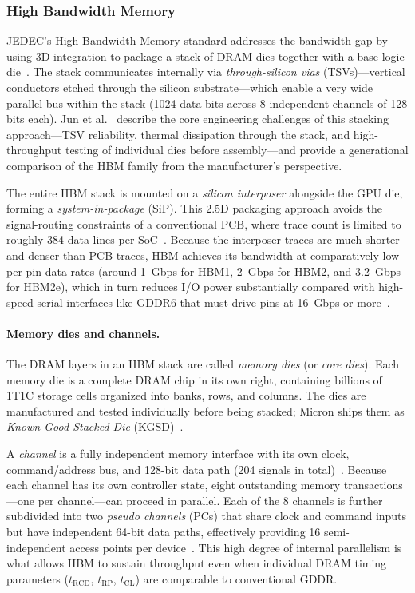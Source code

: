\subsubsection{High Bandwidth Memory}\label{sec:hbm-architecture}

JEDEC's High Bandwidth Memory standard addresses the bandwidth gap by using
3D integration to package a stack of DRAM dies together with a base logic
die~\cite{jedec2013hbm,jedec2016hbm2,jedec2020hbm2e}. The stack communicates
internally via \emph{through-silicon vias} (TSVs)---vertical conductors
etched through the silicon substrate---which enable a very wide parallel bus
within the stack (1024 data bits across 8 independent channels of 128 bits
each). Jun et al.~\cite{jun2017hbm} describe the core engineering
challenges of this stacking approach---TSV reliability, thermal dissipation
through the stack, and high-throughput testing of individual dies before
assembly---and provide a generational comparison of the HBM family from the
manufacturer's perspective.

The entire HBM stack is mounted on a \emph{silicon interposer} alongside the
GPU die, forming a \emph{system-in-package} (SiP). This 2.5D packaging
approach avoids the signal-routing constraints of a conventional PCB, where
trace count is limited to roughly 384 data lines per
SoC~\cite{micron2021hbm2e}. Because the interposer traces are much shorter
and denser than PCB traces, HBM achieves its bandwidth at comparatively low
per-pin data rates (around \SI{1}{\giga bps} for HBM1, \SI{2}{\giga bps}
for HBM2, and \SI{3.2}{\giga bps} for HBM2e), which in turn reduces I/O
power substantially compared with high-speed serial interfaces like GDDR6
that must drive pins at \SI{16}{\giga bps} or
more~\cite{li2018highspeed-dram,micron2021hbm2e}.

\paragraph{Memory dies and channels.}
The DRAM layers in an HBM stack are called \emph{memory dies} (or
\emph{core dies}). Each memory die is a complete DRAM chip in its own right,
containing billions of 1T1C storage cells organized into banks, rows, and
columns. The dies are manufactured and tested individually before being
stacked; Micron ships them as \emph{Known Good Stacked Die}
(KGSD)~\cite{micron2021hbm2e}.

A \emph{channel} is a fully independent memory interface with its own clock,
command/address bus, and 128-bit data path (204 signals in
total)~\cite{micron2021hbm2e}. Because each channel has its own controller
state, eight outstanding memory transactions---one per channel---can proceed
in parallel. Each of the 8 channels is further subdivided into two
\emph{pseudo channels} (PCs) that share clock and command inputs but have
independent 64-bit data paths, effectively providing 16 semi-independent
access points per device~\cite{micron2021hbm2e}. This high degree of
internal parallelism is what allows HBM to sustain throughput even when
individual DRAM timing parameters ($t_\text{RCD}$, $t_\text{RP}$,
$t_\text{CL}$) are comparable to conventional GDDR.

